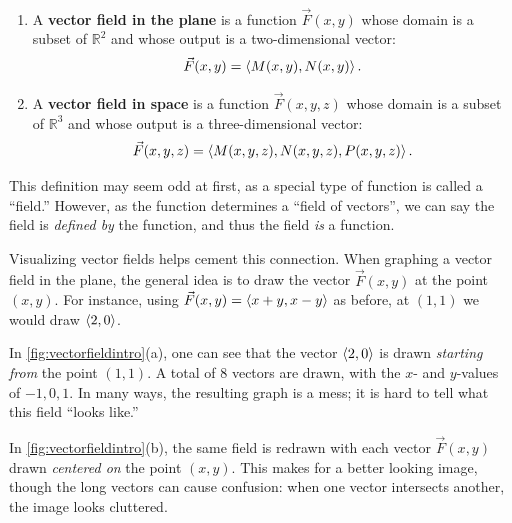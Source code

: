 \begin{definition}\label{def:vector_field}%
%
\mbox{}\\[-2\baselineskip]\parbox[t]{\linewidth}{\begin{enumerate}
	\item A \textbf{vector field in the plane} is a function $\vec F(x,y)$ whose domain is a subset of $\mathbb{R}^2$ and whose output is a two-dimensional vector:
	\[\vec F(x,y) =\left\langle M(x,y), N(x,y)\right\rangle.\]
	\item A \textbf{vector field in space} is a function $\vec F(x,y,z)$ whose domain is a subset of $\mathbb{R}^3$ and whose output is a three-dimensional vector:
	\[\vec F(x,y,z) =\left\langle M(x,y,z), N(x,y,z), P(x,y,z)\right\rangle.\]
\end{enumerate}}
\end{definition}

This definition may seem odd at first, as a special type of function is called a ``field.'' However, as the function determines a ``field of vectors'', we can say the field is \emph{defined by} the function, and thus the field \emph{is} a function.

Visualizing vector fields helps cement this connection. When graphing a vector field in the plane, the general idea is to draw the vector $\vec F(x,y)$ at the point $(x,y)$. For instance, using $\vec F(x,y) =\left\langle x+y,x-y\right\rangle$ as before, at $(1,1)$ we would draw $\left\langle 2,0\right\rangle$. 

In \autoref{fig:vectorfieldintro}(a), one can see that the vector $\left\langle 2,0\right\rangle$ is drawn \emph{starting from} the point $(1,1)$. A total of 8 vectors are drawn, with the $x$- and $y$-values of $-1,0,1$. In many ways, the resulting graph is a mess; it is hard to tell what this field ``looks like.''

In \autoref{fig:vectorfieldintro}(b), the same field is redrawn with each vector $\vec F(x,y)$ drawn \emph{centered on} the point $(x,y)$. This makes for a better looking image, though the long vectors can cause confusion: when one vector intersects another, the image looks cluttered.


